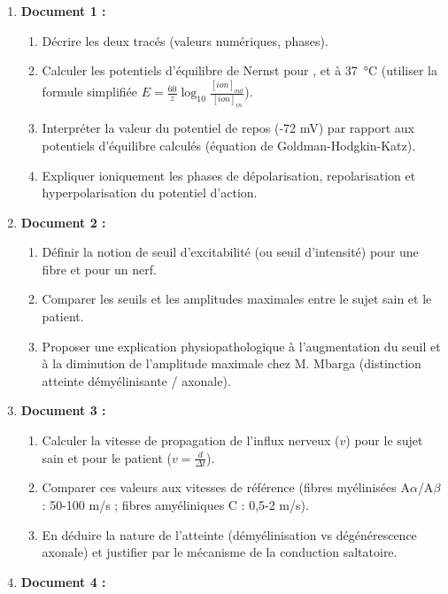 \documentclass[11pt]{article}
\newcommand{\cle}[1]{{\popxbold\color{popdark}#1}}
\newcounter{popsec}
\newcounter{popsub}
\newcommand{\courssub}[1]{%
  \stepcounter{popsub}%
  \par\vspace{9pt}\noindent{\popxbold\fontsize{11.5}{13}\selectfont\color{popink}{\color{poporange}\thepopsec.\thepopsub}\hspace{6pt}#1}\par\nopagebreak\vspace{4pt}
}
\begin{document}
\courssub{Consignes}
\begin{enumerate}
    \item \textbf{Document 1 :} 
    \begin{enumerate}
        \item Décrire les deux tracés (valeurs numériques, phases). 
        \item Calculer les potentiels d'équilibre de Nernst pour ,  et  à \SI{37}{\celsius} (utiliser la formule simplifiée $E = \frac{60}{z} \log_{10} \frac{[ion]_{out}}{[ion]_{in}}$). 
        \item Interpréter la valeur du potentiel de repos (-72 mV) par rapport aux potentiels d'équilibre calculés (équation de Goldman-Hodgkin-Katz). 
        \item Expliquer ioniquement les phases de dépolarisation, repolarisation et hyperpolarisation du potentiel d'action.
    \end{enumerate}
    \item \textbf{Document 2 :} 
    \begin{enumerate}
        \item Définir la notion de \cle{seuil d'excitabilité} (ou seuil d'intensité) pour une fibre et pour un nerf. 
        \item Comparer les seuils et les amplitudes maximales entre le sujet sain et le patient. 
        \item Proposer une explication physiopathologique à l'augmentation du seuil et à la diminution de l'amplitude maximale chez M. Mbarga (distinction atteinte démyélinisante / axonale).
    \end{enumerate}
    \item \textbf{Document 3 :} 
    \begin{enumerate}
        \item Calculer la vitesse de propagation de l'influx nerveux ($v$) pour le sujet sain et pour le patient ($v = \frac{d}{\Delta t}$). 
        \item Comparer ces valeurs aux vitesses de référence (fibres myélinisées A$\alpha$/A$\beta$ : 50-100 m/s ; fibres amyéliniques C : 0,5-2 m/s). 
        \item En déduire la nature de l'atteinte (démyélinisation vs dégénérescence axonale) et justifier par le mécanisme de la conduction saltatoire.
    \end{enumerate}
    \item \textbf{Document 4 :} 
    \begin{enumerate}

\end{enumerate}
\end{enumerate}
\end{document}
